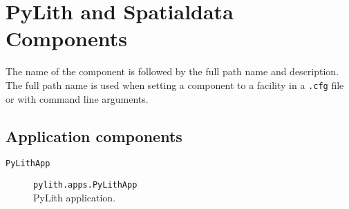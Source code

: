 
\chapter{\label{cha:components}PyLith and Spatialdata Components}

The name of the component is followed by the full path name and description.
The full path name is used when setting a component to a facility
in a \texttt{.cfg} file or with command line arguments.


\section{Application components}
\begin{description}
\item [{\texttt{PyLithApp}}] \texttt{pylith.apps.PyLithApp}\\
PyLith application.
\end{description}

